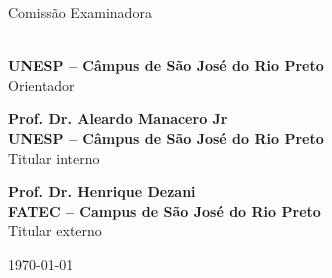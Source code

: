 	\begin{folhadeaprovacao}
	
	\begin{center}
		{\ABNTEXchapterfont\Large\imprimirautor}
		
		\vspace*{\fill}\vspace*{\fill}
		\begin{center}
			\ABNTEXchapterfont\LARGE\imprimirtitulo
		\end{center}
		\vspace*{\fill}
		
		\hspace{.45\textwidth}
			\begin{minipage}{.5\textwidth}
				\SingleSpacing
				\ABNTEXchapterfont\large\imprimirpreambulo
			\end{minipage}%
		\vspace*{\fill}
	\end{center}

	\begin{center}
		\ABNTEXchapterfont\Large Comissão Examinadora
	\end{center}

	\ABNTEXchapterfont\large
	
	\par \noindent \textbf{\imprimirorientador \\ UNESP – Câmpus de São José do Rio Preto} \\ Orientador \\
	
	\par \noindent \textbf{Prof. Dr. Aleardo Manacero Jr \\ UNESP – Câmpus de São José do Rio Preto} \\ Titular interno \\
	
	\par \noindent \textbf{Prof. Dr. Henrique Dezani \\ FATEC – Campus de São José do Rio Preto} \\ Titular externo
	
	\begin{center}
		\vspace*{0.5cm}
		{\large\imprimirlocal}
		\par
		{\large\today}
		\vspace*{1cm}
	\end{center}
\end{folhadeaprovacao}